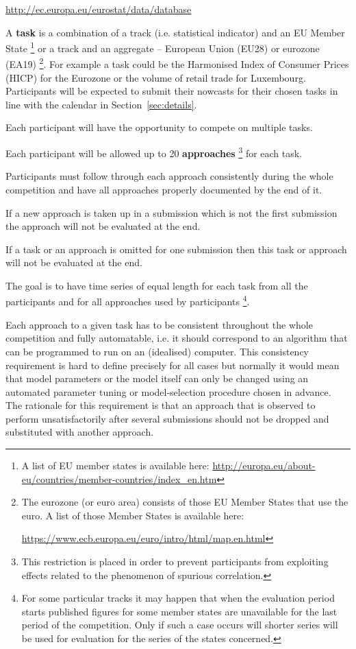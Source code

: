 \documentclass[12pt]{article}
\begin{document}
\url{http://ec.europa.eu/eurostat/data/database}

A \textbf{task} is a combination of a track (i.e. statistical indicator) and an EU Member State \footnote{A list of EU member states is available here: \url{http://europa.eu/about-eu/countries/member-countries/index_en.htm}} or a track and an aggregate – European Union (EU28) or eurozone (EA19) \footnote{The eurozone (or euro area) consists of those EU Member States that use the euro. A list of those Member States is available here:

 \url{https://www.ecb.europa.eu/euro/intro/html/map.en.html}}. For example a task could be the Harmonised Index of Consumer Prices (HICP) for the Eurozone or the volume of retail trade for Luxembourg.
Participants will be expected to submit their nowcasts for their chosen tasks in line with the calendar in Section~\ref{sec:details}.

Each participant will have the opportunity to compete on multiple tasks. 

Each participant will be allowed up to 20 \textbf{approaches} \footnote{This restriction is placed in order to prevent participants from exploiting effects related to the phenomenon of spurious correlation.}  for each task.

Participants must follow through each approach consistently during the whole competition and have all approaches properly documented by the end of it.

If a new approach is taken up in a submission which is not the first submission the approach will not be evaluated at the end. 

If a task or an approach is omitted for one submission then this task or approach will not be evaluated at the end. 

The goal is to have time series of equal length for each task from all the participants and for all approaches used by participants \footnote{For some particular tracks it may happen that when the evaluation period starts published figures for some member states are unavailable for the last period of the competition. Only if such a case occurs will shorter series will be used for evaluation for the series of the states concerned.}.

Each approach to a given task has to be consistent throughout the whole competition and fully automatable, i.e. it should correspond to an algorithm that can be programmed to run on an (idealised) computer. This consistency requirement is hard to define precisely for all cases but normally it would mean that model parameters or the model itself can only be changed using an automated parameter tuning or model-selection procedure chosen in advance.
The rationale for this requirement is that an approach that is observed to perform unsatisfactorily after several submissions should not be dropped and substituted with another approach. 
\end{document}
